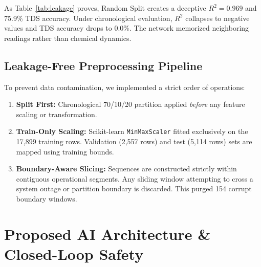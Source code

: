 \documentclass[conference]{IEEEtran}
\begin{document}
As Table~\ref{tab:leakage} proves, Random Split creates a deceptive $R^2 = 0.969$ and 75.9\% TDS accuracy. Under chronological evaluation, $R^2$ collapses to negative values and TDS accuracy drops to 0.0\%. The network memorized neighboring readings rather than chemical dynamics.

\subsection{Leakage-Free Preprocessing Pipeline}
To prevent data contamination, we implemented a strict order of operations:
\begin{enumerate}
    \item \textbf{Split First:} Chronological 70/10/20 partition applied \textit{before} any feature scaling or transformation.
    \item \textbf{Train-Only Scaling:} Scikit-learn \texttt{MinMaxScaler} fitted exclusively on the 17,899 training rows. Validation (2,557 rows) and test (5,114 rows) sets are mapped using training bounds.
    \item \textbf{Boundary-Aware Slicing:} Sequences are constructed strictly within contiguous operational segments. Any sliding window attempting to cross a system outage or partition boundary is discarded. This purged 154 corrupt boundary windows.
\end{enumerate}

\section{Proposed AI Architecture \& Closed-Loop Safety}
\end{document}

